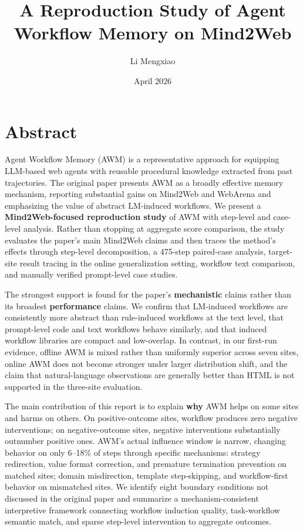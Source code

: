 \documentclass{article}
\title{A Reproduction Study of Agent Workflow Memory on Mind2Web}
\author{Li Mengxiao}
\date{April 2026}
\begin{document}
\maketitle
\tableofcontents
\newpage

\section*{Abstract}

Agent Workflow Memory (AWM) is a representative approach for equipping
LLM-based web agents with reusable procedural knowledge extracted from
past trajectories. The original paper presents AWM as a broadly
effective memory mechanism, reporting substantial gains on Mind2Web and
WebArena and emphasizing the value of abstract LM-induced workflows.
We present a \textbf{Mind2Web-focused reproduction study} of AWM with
step-level and case-level analysis. Rather than stopping at aggregate
score comparison, the study evaluates the paper's main Mind2Web claims
and then traces the method's effects through step-level decomposition, a
475-step paired-case analysis, target-site result tracing in the online
generalization setting, workflow text
comparison, and manually verified prompt-level case studies.

The strongest support is found for the paper's \textbf{mechanistic}
claims rather than its broadest \textbf{performance} claims. We confirm
that LM-induced workflows are consistently more abstract than
rule-induced workflows at the text level, that prompt-level code and
text workflows behave similarly, and that induced workflow libraries are
compact and low-overlap. In contrast, in our first-run evidence, offline AWM is mixed rather than
uniformly superior across seven sites, online AWM does not become
stronger under larger distribution shift, and the claim that
natural-language observations are generally better than HTML is not
supported in the three-site evaluation.

The main contribution of this report is to explain \textbf{why} AWM
helps on some sites and harms on others. On positive-outcome sites,
workflow produces zero negative interventions; on negative-outcome
sites, negative interventions substantially outnumber positive ones.
AWM's actual
influence window is narrow, changing behavior on only 6--18\% of steps
through specific mechanisms: strategy redirection, value format
correction, and premature termination prevention on matched sites;
domain misdirection, template step-skipping, and workflow-first behavior
on mismatched sites. We identify eight boundary conditions not discussed
in the original paper and summarize a mechanism-consistent interpretive
framework connecting workflow induction quality, task-workflow semantic
match, and sparse step-level intervention to aggregate outcomes.
\end{document}
